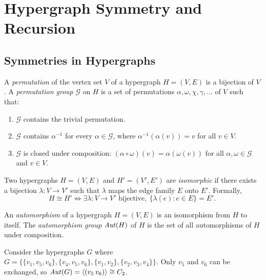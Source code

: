 \chapter{Hypergraph Symmetry and \FKA{} Recursion}

\section{Symmetries in Hypergraphs}\label{sec:symmetries}

\begin{definition}
A \emph{permutation} of the vertex set $V$ of a hypergraph $H=(V,E)$ is a bijection of $V$. A \emph{permutation group} $\mathcal{G}$ on $H$ is a set of permutations $\alpha,\omega,\chi,\gamma,\dots$ of $V$ such that:
\begin{enumerate}
\item $\mathcal{G}$ contains the trivial permutation.
\item $\mathcal{G}$ contains $\alpha^{-1}$ for every $\alpha\in\mathcal{G}$, where $\alpha^{-1}(\alpha(v))=v$ for all $v\in V$.
\item $\mathcal{G}$ is closed under composition: $(\alpha\circ\omega)(v)=\alpha(\omega(v))$ for all $\alpha,\omega\in\mathcal{G}$ and $v\in V$.
\end{enumerate}
 
\end{definition}

\begin{definition}
Two hypergraphs $H=(V,E)$ and $H'=(V',E')$ are \emph{isomorphic} if there exists a bijection $\lambda:V\to V'$ such that $\lambda$ maps the edge family $E$ onto $E'$. Formally,
\[
H\cong H'\iff\exists\lambda:V\to V'\text{ bijective},\ \{\lambda(e):e\in E\}=E'.
\]
\end{definition}

\begin{definition}
An \emph{automorphism} of a hypergraph $H=(V,E)$ is an isomorphism from $H$ to itself. The \emph{automorphism group} $\mathit{Aut}(H)$ of $H$ is the set of all automorphisms of $H$ under composition.
\end{definition}

Consider the hypergraphs $G$ where $G=\{\{v_1,v_5,v_6\},\{v_4,v_5,v_6\},\{v_1,v_2\},\{v_2,v_3,v_4\}\}$. Only $v_5$ and $v_6$ can be exchanged, so $\mathit{Aut}(G)=\langle(v_5\,v_6)\rangle\cong C_2$.

